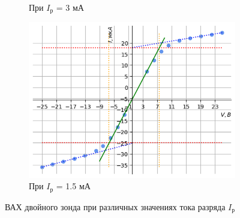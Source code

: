 \begin{figure}[h!]
\begin{subfigure}{0.5\linewidth}
        \caption{При $I_{\text{р}}$ = 3 мА}
    \end{subfigure}
    \hfill
    \begin{subfigure}{0.5\linewidth}
        \centering
        \includegraphics[width=10cm]{images/plotI_1.5.png}
        \caption{При $I_{\text{р}}$ = 1.5 мА}
    \end{subfigure}
    \caption{ВАХ двойного зонда при различных значениях тока разряда $I_{\text{р}}$}
\end{figure}


